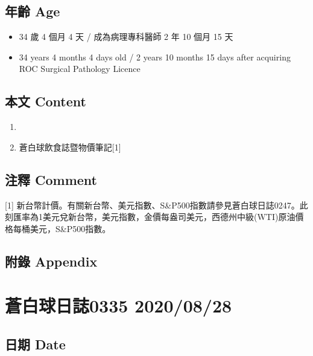 \documentclass[a5paper, 11pt
]{book}
\providecommand{\tightlist}{%
  \setlength{\itemsep}{0pt}\setlength{\parskip}{0pt}}
\begin{document}
\hypertarget{ux5e74ux9f61-age-87}{%
\subsection{年齡 Age}\label{ux5e74ux9f61-age-87}}

\begin{itemize}
\tightlist
\item
  34 歲 4 個月 4 天 / 成為病理專科醫師 2 年 10 個月 15 天
\item
  34 years 4 months 4 days old / 2 years 10 months 15 days after
  acquiring ROC Surgical Pathology Licence
\end{itemize}

\hypertarget{ux672cux6587-content-87}{%
\subsection{本文 Content}\label{ux672cux6587-content-87}}

\begin{enumerate}
\def\labelenumi{\arabic{enumi}.}
\tightlist
\item
\item
  蒼白球飲食誌暨物價筆記{[}1{]}
\end{enumerate}

\hypertarget{ux6ce8ux91cb-comment-87}{%
\subsection{注釋 Comment}\label{ux6ce8ux91cb-comment-87}}

{[}1{]}
新台幣計價。有關新台幣、美元指數、S\&P500指數請參見蒼白球日誌0247。此刻匯率為1美元兌新台幣，美元指數，金價每盎司美元，西德州中級(WTI)原油價格每桶美元，S\&P500指數。

\hypertarget{ux9644ux9304-appendix-87}{%
\subsection{附錄 Appendix}\label{ux9644ux9304-appendix-87}}

\hypertarget{ux84bcux767dux7403ux65e5ux8a8c0335-20200828}{%
\section{蒼白球日誌0335
2020/08/28}\label{ux84bcux767dux7403ux65e5ux8a8c0335-20200828}}

\hypertarget{ux65e5ux671f-date-88}{%
\subsection{日期 Date}\label{ux65e5ux671f-date-88}}
\end{document}

